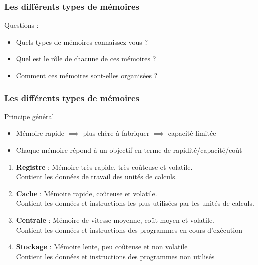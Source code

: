 \documentclass[8pt]{beamer}
\begin{document}
\begin{frame}
    \frametitle{Les différents types de mémoires}
    \begin{alertblock}{Questions :}
        \begin{itemize}
            \item Quels types de m\'emoires connaissez-vous ?
            \item Quel est le r\^ole de chacune de ces m\'emoires ?
            \item Comment ces m\'emoires sont-elles organis\'ees ?
        \end{itemize}
    \end{alertblock}
\end{frame}

\begin{frame}
    \frametitle{Les différents types de mémoires}
    \begin{block}{Principe général}
        \begin{itemize}
            \item M\'emoire rapide $\implies$ plus  ch\`ere \`a
                  fabriquer $\implies$ capacité  limit\'ee
            \item Chaque m\'emoire r\'epond \`a un objectif en
                  terme de rapidit\'e/capacité/co\^ut
        \end{itemize}
    \end{block}
    \begin{enumerate}
        \item \textbf{Registre} : Mémoire très rapide, très coûteuse et
              volatile. \\
              Contient les données de travail des unités de calculs.
        \item \textbf{Cache} : Mémoire rapide, coûteuse et volatile. \\
              Contient les données et instructions les plus utilisées par les
              unités de calculs.
        \item \textbf{Centrale} : Mémoire de vitesse moyenne, coût moyen et
              volatile. \\
              Contient les données et instructions des programmes en cours
              d'exécution
        \item \textbf{Stockage} : Mémoire lente, peu coûteuse et non volatile
              \\
              Contient les données et instructions des programmes non utilisés
              \\
    \end{enumerate}

\end{frame}
\end{document}
